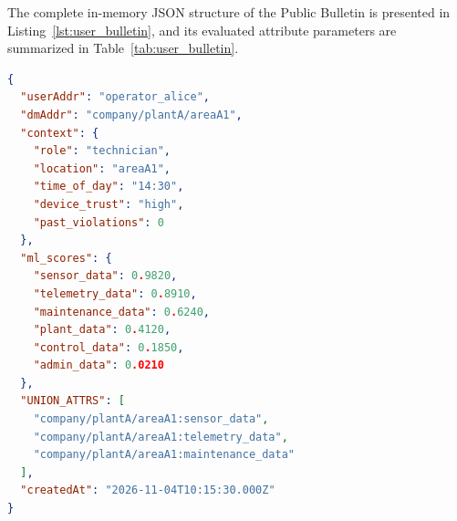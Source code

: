 \documentclass[conference]{IEEEtran}
\begin{document}
The complete in-memory JSON structure of the Public Bulletin is presented in Listing~\ref{lst:user_bulletin}, and its evaluated attribute parameters are summarized in Table~\ref{tab:user_bulletin}.

\begin{lstlisting}[language=json, caption={User Identity Public Bulletin Schema (\texttt{bulletin.json})}, label={lst:user_bulletin}]
{
  "userAddr": "operator_alice",
  "dmAddr": "company/plantA/areaA1",
  "context": {
    "role": "technician",
    "location": "areaA1",
    "time_of_day": "14:30",
    "device_trust": "high",
    "past_violations": 0
  },
  "ml_scores": {
    "sensor_data": 0.9820,
    "telemetry_data": 0.8910,
    "maintenance_data": 0.6240,
    "plant_data": 0.4120,
    "control_data": 0.1850,
    "admin_data": 0.0210
  },
  "UNION_ATTRS": [
    "company/plantA/areaA1:sensor_data",
    "company/plantA/areaA1:telemetry_data",
    "company/plantA/areaA1:maintenance_data"
  ],
  "createdAt": "2026-11-04T10:15:30.000Z"
}
\end{lstlisting}

\begin{table}[htbp]
\caption{User Identity Public Bulletin Schema \& Attribute Scoring}
\label{tab:user_bulletin}
\centering
{}
\end{table}
\end{document}
